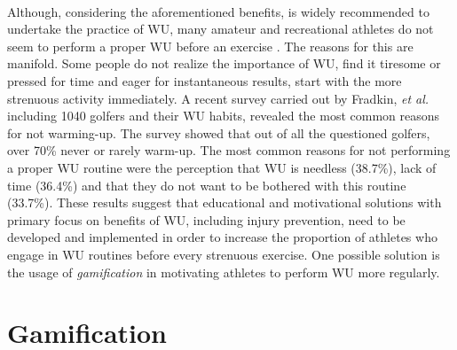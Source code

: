 \\Although, considering the aforementioned benefits, is widely recommended to undertake the practice of WU, many amateur and recreational athletes do not seem to perform a proper WU before an exercise \cite{fradkin2010effects}. The reasons for this are manifold. Some people do not realize the importance of WU, find it tiresome or pressed for time and eager for instantaneous results, start with the more strenuous activity immediately. A recent survey carried out by Fradkin, \textit{et al.} including 1040 golfers and their WU habits, revealed the most common reasons for not warming-up. The survey showed that out of all the questioned golfers, over 70\% never or rarely warm-up. The most common reasons for not performing a proper WU routine were the perception that WU is needless (38.7\%), lack of time (36.4\%) and that they do not want to be bothered with this routine (33.7\%).
These results suggest that educational and motivational solutions with primary focus on benefits of WU, including injury prevention, need to be developed and implemented in order to increase the proportion of athletes who engage in WU routines before every strenuous exercise. One possible solution is the usage of \textit{gamification} in motivating athletes to perform WU more regularly. 
\pagebreak
\section{Gamification}
